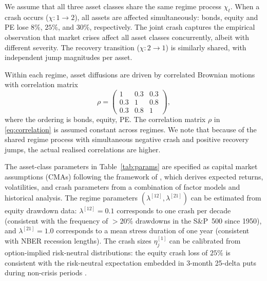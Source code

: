 \documentclass[11pt,a4paper]{article}
\numberwithin{equation}{section}
\begin{document}
We assume that all three asset classes share the same regime process $\chi_t$. When a crash occurs ($\chi: 1 \to 2$), all assets are affected simultaneously: bonds, equity and PE lose $8\%$, $25\%$, and $30\%$, respectively. The joint crash captures the empirical observation that market crises affect all asset classes concurrently, albeit with different severity. The recovery transition ($\chi: 2 \to 1$) is similarly shared, with independent jump magnitudes per asset.

Within each regime, asset diffusions are driven by correlated Brownian motions with correlation matrix
\begin{equation}\label{eq:correlation}
\rho = \begin{pmatrix} 1 & 0.3 & 0.3 \\ 0.3 & 1 & 0.8 \\ 0.3 & 0.8 & 1 \end{pmatrix},
\end{equation}
where the ordering is bonds, equity, PE. The correlation matrix $\rho$ in \eqref{eq:correlation} is assumed constant across regimes. We note that because of the shared regime process with simultaneous negative crash and positive recovery jumps, the actual realised correlations are higher.

The asset-class parameters in Table~\ref{tab:params} are specified as capital market assumptions (CMAs) following the framework of \citet{SeppHansenKastenholz2026}, which derives expected returns, volatilities, and crash parameters from a combination of factor models and historical analysis.  The regime parameters $(\lambda^{[12]}, \lambda^{[21]})$ can be estimated from equity drawdown data: $\lambda^{[12]} = 0.1$ corresponds to one crash per decade (consistent with the frequency of $>20\%$ drawdowns in the S\&P~500 since 1950), and $\lambda^{[21]} = 1.0$ corresponds to a mean stress duration of one year (consistent with NBER recession lengths).  The crash sizes $\eta^{[1]}_j$ can be calibrated from option-implied risk-neutral distributions: the equity crash loss of $25\%$ is consistent with the risk-neutral expectation embedded in 3-month 25-delta puts during non-crisis periods \citep[see][for option-based regime calibration]{Sepp2004}.
\end{document}
